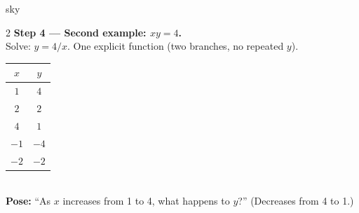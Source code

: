 \documentclass[10pt]{article}
\begin{document}
\begin{skillbox}{sky}
\begin{multicols}{2}
\textbf{Step 4 --- Second example: $xy = 4$.}\\
Solve: $y = 4/x$.  One explicit function (two branches, no repeated $y$).\\[4pt]
\begin{tabular}{c|c}
$x$ & $y$ \\\hline
$1$ & $4$  \\ $2$ & $2$ \\ $4$ & $1$ \\
$-1$ & $-4$ \\ $-2$ & $-2$ \\
\end{tabular}\\[4pt]
\textbf{Pose:} ``As $x$ increases from 1 to 4, what happens to $y$?''
(Decreases from 4 to 1.)
\end{multicols}
\end{skillbox}
\end{document}
